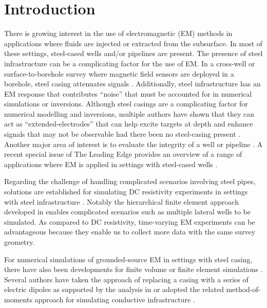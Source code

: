 
\section{Introduction}

There is growing interest in the use of electromagnetic (EM) methods in applications where fluids are injected or extracted from the subsurface. In most of these settings, steel-cased wells and/or pipelines are present. The presence of steel infrastructure can be a complicating factor for the use of EM. In a cross-well or surface-to-borehole survey where magnetic field sensors are deployed in a borehole, steel casing attenuates signals \citep{augustin_theoretical_1989, Wu1994, Wilt1996, cuevas_analytical_2014}. Additionally, steel infrastructure has an EM response that contributes ``noise'' that must be accounted for in numerical simulations or inversions. Although steel casings are a complicating factor for numerical modelling and inversions, multiple authors have shown that they can act as ``extended-electrodes'' that can help excite targets at depth and enhance signals that may not be observable had there been no steel-casing present \citep{schenkel_electrical_1994, hoversten_hydro-frac_2015, yang_3d_2016, puzyrev_three-dimensional_2017}. Another major area of interest is to evaluate the integrity of a well or pipeline \cite{wilt_casing_2020, beskardes_effects_2021}. A recent special issue of The Leading Edge provides an overview of a range of applications where EM is applied in settings with steel-cased wells \citep{weiss_introduction_2022}.

Regarding the challenge of handling complicated scenarios involving steel pipes, solutions are established for simulating DC resistivity experiments in settings with steel infrastructure \cite{schenkel_electrical_1994, yang_3d_2016, heagy_direct_2019}. Notably the hierarchical finite element approach developed in \cite{Weiss2017} enables complicated scenarios such as multiple lateral wells to be simulated. As compared to DC resistivity, time-varying EM experiments can be advantageous because they enable us to collect more data with the same survey geometry.

For numerical simulations of grounded-source EM in settings with steel casing, there have also been developments for finite volume or finite element simulations \citep{Um2015, commer_transient-electromagnetic_2015, haber_modeling_2016, heagy_modeling_2019}. Several authors have taken the approach of replacing a casing with a series of electric dipoles as supported by the analysis in \citep{cuevas_analytical_2014} or adopted the related method-of-moments approach for simulating conductive infrastructure \citep{tang_three-dimensional_2015, patzer_steel-cased_2017, kohnke_method_2018, orujov_electromagnetic_2020}.

